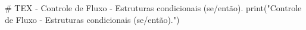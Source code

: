 # TEX - Controle de Fluxo - Estruturas condicionais (se/então).
print("Controle de Fluxo - Estruturas condicionais (se/então).")
